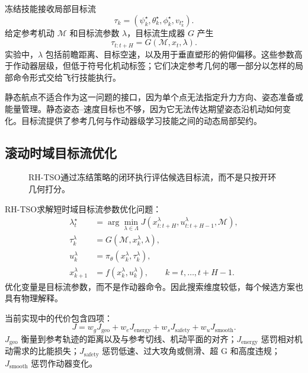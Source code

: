\documentclass{article}
\newcommand{\rhtso}{RH-TSO}
\newcommand{\vt}{v_t}
\begin{document}
冻结技能接收局部目标流
\begin{equation}
  \tau_k = (\psi_k^\star,\theta_k^\star,\phi_k^\star,\vt_k^\star).
\end{equation}
给定参考机动 $\mathcal{M}$ 和目标流参数 $\lambda$，目标流生成器 $G$ 产生
\begin{equation}
  \tau_{t:t+H} = G(\mathcal{M}, x_t, \lambda).
\end{equation}
实验中，$\lambda$ 包括前瞻距离、目标空速，以及用于垂直塑形的俯仰偏移。这些参数高于作动器层级，但低于符号化机动标签；它们决定参考几何的哪一部分以怎样的局部命令形式交给飞行技能执行。

静态航点不适合作为这一问题的接口，因为单个点无法指定升力方向、姿态准备或能量管理。静态姿态--速度目标也不够，因为它无法传达期望姿态沿机动如何变化。目标流提供了参考几何与作动器级学习技能之间的动态局部契约。

\subsection{滚动时域目标流优化}

\begin{figure}[t]
  \centering
  \caption{\rhtso 通过冻结策略的闭环执行评估候选目标流，而不是只按开环几何打分。}
  \label{fig:rhtso-cn}
\end{figure}

\rhtso 求解短时域目标流参数优化问题：
\begin{align}
  \lambda_t^\star
  &= \arg\min_{\lambda \in \Lambda} J(x_{t:t+H}^{\lambda},u_{t:t+H-1}^{\lambda},\mathcal{M}), \label{eq:rhtso-cn}\\
  \tau_k^\lambda &= G(\mathcal{M},x_k^\lambda,\lambda), \\
  u_k^\lambda &= \pi_\theta(x_k^\lambda,\tau_k^\lambda), \\
  x_{k+1}^\lambda &= f(x_k^\lambda,u_k^\lambda),
  \qquad k=t,\ldots,t+H-1 .
\end{align}
优化变量是目标流参数，而不是作动器命令。因此搜索维度较低，每个候选方案也具有物理解释。

当前实现中的代价包含四项：
\begin{equation}
  J = w_gJ_{\mathrm{geo}} + w_eJ_{\mathrm{energy}} + w_sJ_{\mathrm{safety}} + w_uJ_{\mathrm{smooth}}.
  \label{eq:cost-cn}
\end{equation}
$J_{\mathrm{geo}}$ 衡量到参考轨迹的距离以及与参考切线、机动平面的对齐；$J_{\mathrm{energy}}$ 惩罚相对机动需求的比能损失；$J_{\mathrm{safety}}$ 惩罚低速、过大攻角或侧滑、超 G 和高度违规；$J_{\mathrm{smooth}}$ 惩罚作动器变化。
\end{document}
